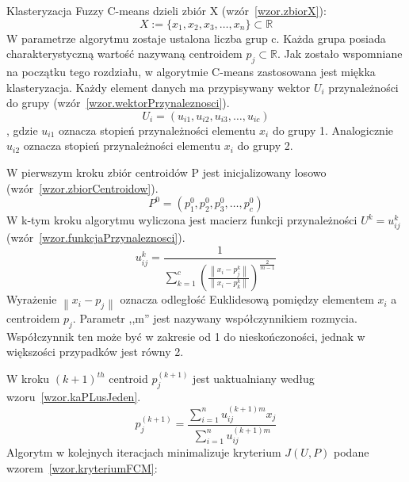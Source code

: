 \documentclass[a4paper,twoside,12pt]{book}
\begin{document}
    Klasteryzacja Fuzzy C-means dzieli zbiór X (wzór~\ref{wzor.zbiorX}):
    \large
    \begin{equation}
        X:=\{x_{1},x_{2},x_{3},\ldots,x_{n}\}\subset \mathbb{R}
        \label{wzor.zbiorX}
    \end{equation}
    \normalsize
    W parametrze algorytmu zostaje ustalona liczba grup c.
    Każda grupa posiada charakterystyczną wartość nazywaną centroidem $p_{j}\subset \mathbb{R}$.
    Jak zostało wspomniane na początku tego rozdziału, w algorytmie C-means zastosowana jest miękka klasteryzacja.
    Każdy element danych ma przypisywany wektor $U_{i}$ przynależności do grupy (wzór~\ref{wzor.wektorPrzynaleznosci}).
    \large
    \begin{equation}
        U_{i}=(u_{i1}, u_{i2}, u_{i3}, \ldots, u_{ic})
        \label{wzor.wektorPrzynaleznosci}
    \end{equation}
    \normalsize
    , gdzie $u_{i1}$ oznacza stopień przynależności elementu $x_{i}$ do grupy 1.
    Analogicznie $u_{i2}$ oznacza stopień przynależności elementu $x_{i}$ do grupy 2.

    W pierwszym kroku zbiór centroidów P jest inicjalizowany losowo (wzór~\ref{wzor.zbiorCentroidow}).
    \large
    \begin{equation}
        P^{0}=(p_{1}^{0}, p_{2}^{0}, p_{3}^{0}, \ldots, p_{c}^{0})
        \label{wzor.zbiorCentroidow}
    \end{equation}
    \normalsize
    W k-tym kroku algorytmu wyliczona jest macierz funkcji przynależności $U^{k} = {u_{ij}^{k}}$ (wzór~\ref{wzor.funkcjaPrzynaleznosci}).
    \large
    \begin{equation}
        u_{ij}^{k} = \frac{1}{\sum_{k=1}^{c}\left ( \frac{\left \| x_{i} - p_{j}^{k} \right \|}{\left \|x_{i} - p_{k}^{k}  \right \|} \right )^{\frac{2}{m-1}}}
        \label{wzor.funkcjaPrzynaleznosci}
    \end{equation}
    \normalsize
    Wyrażenie $\left \| x_{i} - p_{j} \right \|$ oznacza odległość Euklidesową pomiędzy elementem $x_{i}$ a
    centroidem $p_{j}$. Parametr ,,m'' jest nazywany współczynnikiem rozmycia. Współczynnik ten może być w zakresie
    od 1 do nieskończoności, jednak w większości przypadków jest równy 2.

    W kroku $(k+1)^{th}$ centroid $p_{j}^{(k+1)}$ jest uaktualniany według wzoru~\ref{wzor.kaPLusJeden}.
    \large
    \begin{equation}
        p_{j}^{(k+1)}=\frac{\sum_{i=1}^{n}u_{ij}^{(k+1)m}x_{j}}{\sum_{i=1}^{n}u_{ij}^{(k+1)m}}
        \label{wzor.kaPLusJeden}
    \end{equation}
    \normalsize
    Algorytm w kolejnych iteracjach minimalizuje kryterium $J(U,P)$ podane wzorem~\ref{wzor.kryteriumFCM}:
\end{document}
